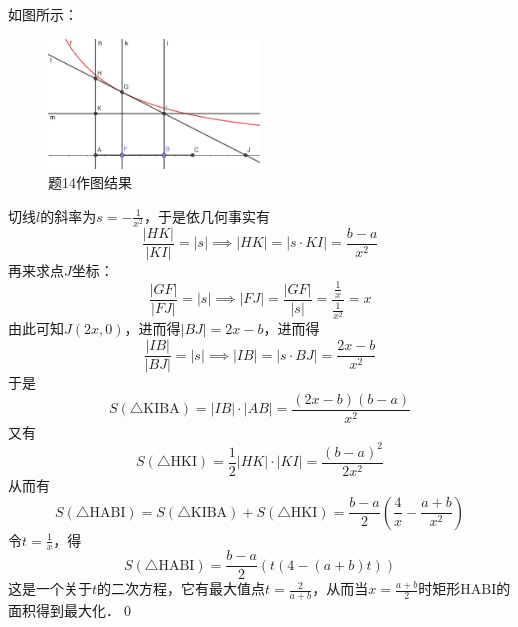 如图所示：
\begin{figure}[H]
    \centering
    \includegraphics[width=0.5\textwidth]{chapter3/hyperbola.png}
    \caption{题14作图结果}
\end{figure}

切线$l$的斜率为$s = -\displaystyle\frac{1}{x^2}$，于是依几何事实有
\begin{equation}
    \frac{\left| HK \right|}{\left| KI \right|} = \left| s \right| \implies \left| HK \right| = \left| s \cdot KI \right| = \frac{b-a}{x^2}
\end{equation}
再来求点$J$坐标：
\begin{equation}
    \frac{\left| GF \right|}{\left| FJ \right|} = \left| s \right| \implies \left| FJ \right| = \frac{\left| GF \right|}{\left| s \right|} = \frac{\displaystyle\frac{1}{x}}{\displaystyle\frac{1}{x^2}} = x
\end{equation}
由此可知$J(2x,0)$，进而得$\left| BJ \right| = 2x - b$，进而得
\begin{equation}
    \frac{\left| IB \right|}{\left| BJ \right|} = \left| s \right| \implies \left| IB \right| = \left| s \cdot BJ \right| = \frac{2x-b}{x^2}
\end{equation}
于是
\begin{equation}
    S(\triangle \mathrm{KIBA}) = \left| IB \right| \cdot \left| AB \right| = \frac{(2x-b)(b-a)}{x^2}
\end{equation}
又有
\begin{equation}
    S(\triangle \mathrm{HKI}) = \frac{1}{2} \left| HK \right| \cdot \left| KI \right| = \frac{(b-a)^2}{2x^2}
\end{equation}
从而有
\begin{equation}
    S(\triangle \mathrm{HABI}) = S(\triangle \mathrm{KIBA}) + S(\triangle \mathrm{HKI}) = \frac{b-a}{2} \left(\frac{4}{x} - \frac{a+b}{x^2}\right)
\end{equation}
令$t = \displaystyle\frac{1}{x}$，得
\begin{equation}
    S(\triangle \mathrm{HABI}) = \frac{b-a}{2} \left(t \left(4  - \left(a+b\right)t\right)\right)
\end{equation}
这是一个关于$t$的二次方程，它有最大值点$t = \displaystyle\frac{2}{a+b}$，从而当$x=\displaystyle\frac{a+b}{2}$时矩形$\mathrm{HABI}$的面积得到最大化．\qed\bigskip

